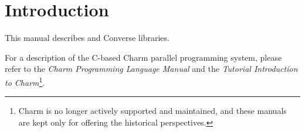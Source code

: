 \section{Introduction}


This manual describes \charmpp and Converse libraries.\cite{InterOpIPPS96}

For a description of the C-based {\sc Charm} parallel programming system,
please refer to the {\sl Charm Programming Language Manual} and the
{\sl Tutorial Introduction to Charm}\footnote{{\sc Charm} is no longer
actively supported and maintained, and these manuals are kept only for
offering the historical perspectives.}.
